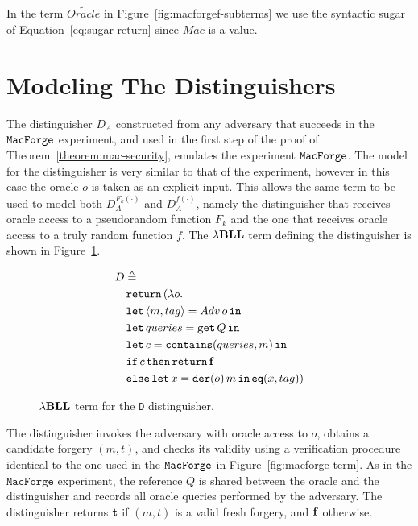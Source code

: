 In the term $\widetilde{Oracle}$ in Figure~\ref{fig:macforgef-subterms} we use the syntactic sugar of Equation~\ref{eq:sugar-return} since $\widetilde{Mac}$ is a value.

\section{Modeling The Distinguishers}

The distinguisher $D_A$ constructed from any adversary that succeeds in the $\mathtt{MacForge}$ experiment, and used in the first step of the proof of Theorem~\ref{theorem:mac-security}, emulates the experiment $\mathtt{MacForge}$. The model for the distinguisher is very similar to that of the experiment, however in this case the oracle $o$ is taken as an explicit input. This allows the same term to be used to model both $D_A^{F_k(\cdot)}$ and $D_A^{f(\cdot)}$, namely the distinguisher that receives oracle access to a pseudorandom function $F_k$ and the one that receives oracle access to a truly random function $f$. The ${\lambda}\mathbf{BLL}$ term defining the distinguisher is shown in Figure~\ref{fig:d-term}.

\begin{figure}[ht]
    \centering
    \begin{align*}
        &D \triangleq \\
        &\quad \mathtt{return}\,(\lambda o. \\
        &\quad \mathtt{let}\,\langle m,tag \rangle = Adv\, o\,\mathtt{in}\, \\
        &\quad \mathtt{let}\,queries = \mathtt{get}\, Q\,\mathtt{in}\, \\
        &\quad \mathtt{let}\,c=\mathtt{contains}(queries, m)\,\mathtt{in}\, \\
        &\quad \mathtt{if}\, c\, \mathtt{then}\, \mathtt{return}\, \mathbf{f} \\
        &\quad \mathtt{else}\,\mathtt{let}\,x=\mathtt{der}(o)\, m\,\mathtt{in}\, \mathtt{eq}(x,tag))
    \end{align*}
    \caption{${\lambda}\mathbf{BLL}$ term for the $\mathtt{D}$ distinguisher.}
    \label{fig:d-term}
\end{figure}

The distinguisher invokes the adversary with oracle access to $o$, obtains a candidate forgery $(m,t)$, and checks its validity using a verification procedure identical to the one used in the $\mathtt{MacForge}$ in Figure~\ref{fig:macforge-term}. As in the $\mathtt{MacForge}$ experiment, the reference $Q$ is shared between the oracle and the distinguisher and records all oracle queries performed by the adversary. The distinguisher returns $\mathbf{t}$ if $(m,t)$ is a valid fresh forgery, and
$\mathbf{f}$ otherwise.

